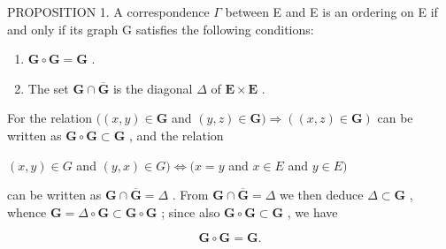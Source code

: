 PROPOSITION 1. A correspondence \(\Gamma\) between E and E is an ordering on E if and only if its graph G satisfies the following conditions:

\begin{enumerate}
\def\labelenumi{(\alph{enumi})}
\item
  \(\mathbf{G} \circ \mathbf{G} = \mathbf{G}\) .
\item
  The set \(\mathbf{G} \cap \overline{\mathbf{G}}\) is the diagonal \(\Delta\) of \(\mathbf{E} \times \mathbf{E}\) .
\end{enumerate}

For the relation \(((x, y) \in \mathbf{G}\) and \((y, z) \in \mathbf{G}) \Longrightarrow ((x, z) \in \mathbf{G})\) can be written as \(\mathbf{G} \circ \mathbf{G} \subset \mathbf{G}\) , and the relation

\((x, y) \in G\) and \((y, x) \in G) \iff (x = y\) and \(x \in E\) and \(y \in E)\)

can be written as \(\mathbf{G} \cap \overline{\mathbf{G}} = \Delta\) . From \(\mathbf{G} \cap \overline{\mathbf{G}} = \Delta\) we then deduce \(\Delta \subset \mathbf{G}\) , whence \(\mathbf{G} = \Delta \circ \mathbf{G} \subset \mathbf{G} \circ \mathbf{G}\) ; since also \(\mathbf{G} \circ \mathbf{G} \subset \mathbf{G}\) , we have

\[
\mathbf {G} \circ \mathbf {G} = \mathbf {G}.
\]

